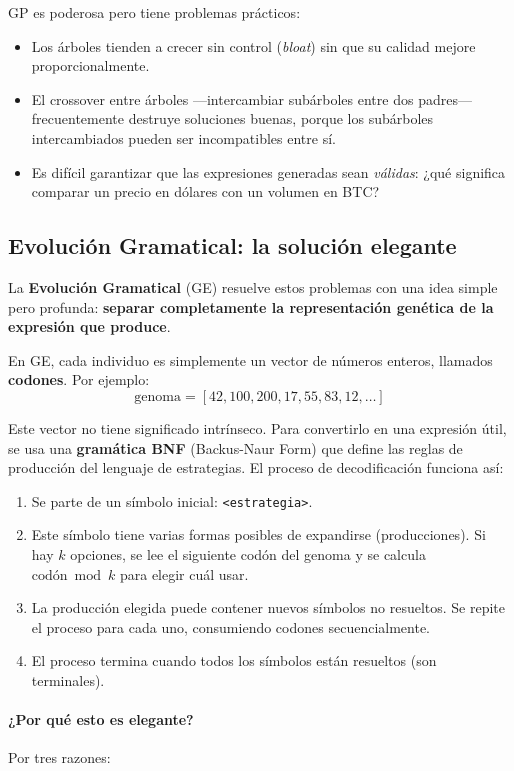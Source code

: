 \documentclass[12pt,a4paper]{article}
\begin{document}
GP es poderosa pero tiene problemas prácticos:
\begin{itemize}
\item Los árboles tienden a crecer sin control (\textit{bloat}) sin que su calidad
  mejore proporcionalmente.
\item El crossover entre árboles ---intercambiar subárboles entre dos padres---
  frecuentemente destruye soluciones buenas, porque los subárboles intercambiados
  pueden ser incompatibles entre sí.
\item Es difícil garantizar que las expresiones generadas sean \textit{válidas}:
  ¿qué significa comparar un precio en dólares con un volumen en BTC?
\end{itemize}

\subsection{Evolución Gramatical: la solución elegante}
\label{sec:ge}

La \textbf{Evolución Gramatical} (GE) resuelve estos
problemas con una idea simple pero profunda: \textbf{separar completamente la
representación genética de la expresión que produce}.

En GE, cada individuo es simplemente un vector de números enteros, llamados
\textbf{codones}. Por ejemplo:
$$\text{genoma} = [42, 100, 200, 17, 55, 83, 12, \ldots]$$

Este vector no tiene significado intrínseco. Para convertirlo en una expresión
útil, se usa una \textbf{gramática BNF} (Backus-Naur Form) que define las reglas
de producción del lenguaje de estrategias. El proceso de decodificación funciona
así:

\begin{enumerate}
\item Se parte de un símbolo inicial: \texttt{<estrategia>}.
\item Este símbolo tiene varias formas posibles de expandirse (producciones). Si hay
  $k$ opciones, se lee el siguiente codón del genoma y se calcula
  $\text{codón} \bmod k$ para elegir cuál usar.
\item La producción elegida puede contener nuevos símbolos no resueltos. Se repite el
  proceso para cada uno, consumiendo codones secuencialmente.
\item El proceso termina cuando todos los símbolos están resueltos (son terminales).
\end{enumerate}

\paragraph{¿Por qué esto es elegante?} Por tres razones:
\end{document}
